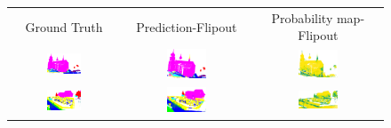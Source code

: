     \begin{figure}[h!]
        \centering
        \begin{tabular}{ccc}
            Ground Truth & Prediction-Flipout & Probability map-Flipout \\
            \includegraphics[width=0.33\textwidth, height=0.18\textheight]{images/seg_output/sem3d_seg_output/1_GT.png} &
            \includegraphics[width=0.33\textwidth, height=0.18\textheight]{images/seg_output/flipout/sem3d_1.png}& 
            \includegraphics[width=0.33\textwidth, height=0.18\textheight]{images/seg_output/flipout/1_fout_prob.png}\\

            \includegraphics[width=0.33\textwidth, height=0.18\textheight]{images/seg_output/sem3d_seg_output/2_GT.png} &
            \includegraphics[width=0.33\textwidth, height=0.18\textheight]{images/seg_output/flipout/sem3d_2.png}& 
            \includegraphics[width=0.33\textwidth, height=0.18\textheight]{images/seg_output/flipout/2_fout_prob.png}\\


\end{tabular}
\end{figure}
